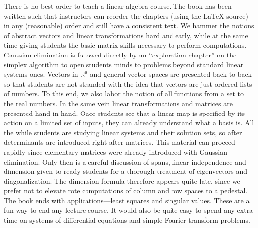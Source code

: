 There is no best order to teach a linear algebra course. The book has been written such that instructors can reorder the chapters (using the LaTeX source) in any (reasonable) order and still have a consistent text. We hammer the notions of abstract vectors and linear transformations hard and  early, while at the same time giving students the basic matrix skills necessary to perform computations.
Gaussian elimination is followed directly by an ``exploration chapter'' on the simplex algorithm to open students minds to problems 
beyond standard linear systems ones. Vectors in ${\mathbb R}^n$ and general vector spaces are presented back to back so that students
are not stranded with the idea that vectors are just ordered lists of numbers. To this end, we also labor the notion of all functions from a set to 
the real numbers. In the same vein linear transformations and matrices are presented hand in hand. Once students see that a linear map
is specified by its action on a limited set of inputs, they can already understand what a basis is.
All the while students are studying linear systems and their solution sets, so after determinants are introduced right after  matrices.
This material can proceed rapidly since elementary matrices were already introduced with Gaussian elimination. Only then is a careful 
discussion of spans, linear independence and dimension given to ready students for a thorough treatment of eigenvectors and
diagonalization. The dimension formula therefore appears quite late, since we prefer not to elevate rote computations of column and
row spaces to a pedestal. The book ends with applications---least squares and singular values. These are a fun way to end any lecture course.
It would also be quite easy to spend any extra time on systems of differential equations and simple Fourier transform problems.

